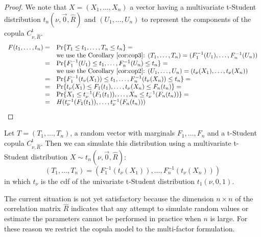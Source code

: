 \documentclass[11pt,fleqn]{book} %
\begin{document}
\begin{proof}
	We note that $X=(X_1,\dots,X_n)$ a vector having a multivariate t-Student
	distribution $t_n(\nu,\vec{0},\widehat{R})$ and $(U_1,\dots,U_n)$ to 
	represent the components of the copula $C_{\nu,\widehat{R}}^{\text{t}}$.
	\begin{displaymath}
		\begin{array}{rl}
			F(t_1,\dots,t_n) = & \Pr\{ T_1 \le t_1 , \dots, T_n \le t_n \} = \\
			                   & \text{we use the Corollary~\ref{cor:cop3}: }
			(T_1,\dots,T_n) = (F_1^{-1}(U_1),\dots,F_n^{-1}(U_n)) \\
			=                  & \Pr\{ F_1^{-1}(U_1) \le t_1 , \dots , F_n^{-1}(U_n) \le t_n \} = \\
			                   & \text{we use the Corollary~\ref{cor:cop2}: }
			(U_1,\dots,U_n) = (t_\nu(X_1),\dots,t_\nu(X_n)) \\
			=                  & \Pr\{ F_1^{-1}(t_\nu(X_1)) \le t_1 , \dots , F_n^{-1}(t_\nu(X_n)) \le t_n \} = \\
			=                  & \Pr\{ t_\nu(X_1) \le F_1(t_1), \dots , t_\nu(X_n) \le F_n(t_n) \} = \\
			=                  & \Pr\{ X_1 \le t_\nu^{-1}(F_1(t_1)), \dots , X_n \le t_\nu^{-1}(F_n(t_n)) \} = \\
			=                  & H(t_\nu^{-1}(F_1(t_1)), \dots, t_\nu^{-1}(F_n(t_n))) \\
		\end{array}
	\end{displaymath}
\end{proof}

\begin{corollary}
	\label{cor:dts1}
	Let $T=(T_1, \dots, T_n)$, a random vector with marginals 
	$F_1, \dots, F_n$ and a t-Student copula $C_{\nu,\widehat{R}}^{\text{t}}$. 
	Then we can simulate this distribution using a multivariate t-Student 
	distribution $X \sim t_n(\nu,\vec{0},\widehat{R})$:
	\begin{displaymath}
		(T_1, \dots, T_n) = \left(
		F_1^{-1}\left(t_{\nu}(X_1)\right), \dots, F_n^{-1}\left(t_{\nu}(X_n)\right)
		\right)
	\end{displaymath}
	in which $t_\nu$ is the cdf of the univariate t-Student distribution 
	$t_1(\nu,0,1)$.
\end{corollary}

The current situation is not yet satisfactory because the dimension 
$n {\times} n$ of the correlation matrix $\widehat{R}$ indicates that any 
attempt to simulate random values or estimate the parameters cannot be 
performed in practice when $n$ is large. For these reason we restrict the 
copula model to the multi-factor formulation.
\end{document}
